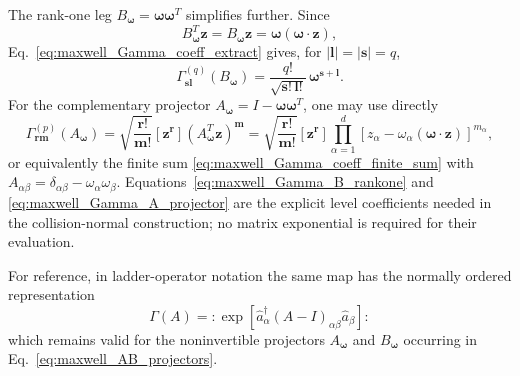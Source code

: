 \documentclass[11pt,oneside]{article}
\numberwithin{equation}{section}
\theoremstyle{definition}
\begin{document}
The rank-one leg $B_{\bm\omega}=\bm\omega\bm\omega^T$ simplifies further.
Since
\begin{equation}
B_{\bm\omega}^T\bm z
=
B_{\bm\omega}\bm z
=
\bm\omega(\bm\omega\cdot\bm z),
\end{equation}
Eq.~\eqref{eq:maxwell_Gamma_coeff_extract} gives, for
$|\bm l|=|\bm s|=q$,
\begin{equation}
\Gamma^{(q)}_{\bm s\bm l}(B_{\bm\omega})
=
\frac{q!}{\sqrt{\bm s!\,\bm l!}}
\,\bm\omega^{\bm s+\bm l}.
\label{eq:maxwell_Gamma_B_rankone}
\end{equation}
For the complementary projector
$A_{\bm\omega}=I-\bm\omega\bm\omega^T$, one may use directly
\begin{equation}
\Gamma^{(p)}_{\bm r\bm m}(A_{\bm\omega})
=
\sqrt{\frac{\bm r!}{\bm m!}}
[\bm z^{\bm r}]
(A_{\bm\omega}^T\bm z)^{\bm m}
=
\sqrt{\frac{\bm r!}{\bm m!}}
[\bm z^{\bm r}]
\prod_{\alpha=1}^{d}
\left[
 z_\alpha-\omega_\alpha(\bm\omega\cdot\bm z)
\right]^{m_\alpha},
\label{eq:maxwell_Gamma_A_projector}
\end{equation}
or equivalently the finite sum
\eqref{eq:maxwell_Gamma_coeff_finite_sum} with
$A_{\alpha\beta}=\delta_{\alpha\beta}-\omega_\alpha\omega_\beta$.
Equations~\eqref{eq:maxwell_Gamma_B_rankone} and
\eqref{eq:maxwell_Gamma_A_projector} are the explicit level coefficients
needed in the collision-normal construction; no matrix exponential is
required for their evaluation.

For reference, in ladder-operator notation the same map has the normally ordered representation
\begin{equation}
\Gamma(A)
=
:\!\exp\!\left[
\hat a_\alpha^\dagger(A-I)_{\alpha\beta}\hat a_\beta
\right]\!:
\label{eq:maxwell_Gamma_normal}
\end{equation}
which remains valid for the noninvertible projectors $A_{\bm\omega}$ and $B_{\bm\omega}$ occurring in Eq.~\eqref{eq:maxwell_AB_projectors}.
\end{document}
